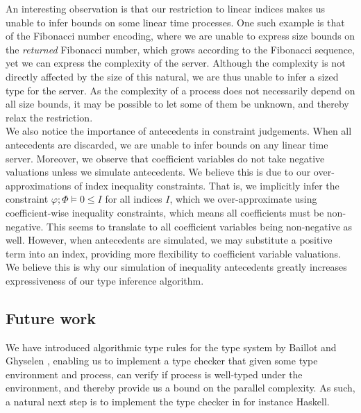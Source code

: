 An interesting observation is that our restriction to linear indices makes us unable to infer bounds on some linear time processes. One such example is that of the Fibonacci number encoding, where we are unable to express size bounds on the \textit{returned} Fibonacci number, which grows according to the Fibonacci sequence, yet we can express the complexity of the server. Although the complexity is not directly affected by the size of this natural, we are thus unable to infer a sized type for the server. As the complexity of a process does not necessarily depend on all size bounds, it may be possible to let some of them be unknown, and thereby relax the restriction.\\

We also notice the importance of antecedents in constraint judgements. When all antecedents are discarded, we are unable to infer bounds on any linear time server. Moreover, we observe that coefficient variables do not take negative valuations unless we simulate antecedents. We believe this is due to our over-approximations of index inequality constraints. That is, we implicitly infer the constraint $\varphi;\Phi\vDash 0 \leq I$ for all indices $I$, which we over-approximate using coefficient-wise inequality constraints, which means all coefficients must be non-negative. This seems to translate to all coefficient variables being non-negative as well. However, when antecedents are simulated, we may substitute a positive term into an index, providing more flexibility to coefficient variable valuations. We believe this is why our simulation of inequality antecedents greatly increases expressiveness of our type inference algorithm.




\subsection{Future work}
We have introduced algorithmic type rules for the type system by Baillot and Ghyselen \cite{BaillotGhyselen2021}, enabling us to implement a type checker that given some type environment and process, can verify if process is well-typed under the environment, and thereby provide us a bound on the parallel complexity. As such, a natural next step is to implement the type checker in for instance Haskell.\\

